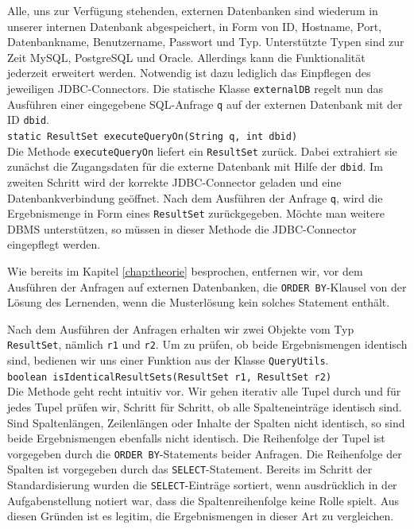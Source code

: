 Alle, uns zur Verfügung stehenden, externen Datenbanken sind wiederum in unserer internen Datenbank abgespeichert, in Form von ID, Hostname, Port, Datenbankname, Benutzername, Passwort und Typ. Unterstützte Typen sind zur Zeit MySQL, PostgreSQL und Oracle. Allerdings kann die Funktionalität jederzeit erweitert werden. Notwendig ist dazu lediglich das Einpflegen des jeweiligen JDBC-Connectors. Die statische Klasse \verb|externalDB| regelt nun das Ausführen einer eingegebene SQL-Anfrage \verb|q| auf der externen Datenbank mit der ID \verb|dbid|. \\
\verb|static ResultSet executeQueryOn(String q, int dbid)|\\
Die Methode \verb|executeQueryOn| liefert ein \verb|ResultSet| zurück. Dabei extrahiert sie zunächst die Zugangsdaten für die externe Datenbank mit Hilfe der \verb|dbid|. Im zweiten Schritt wird der korrekte JDBC-Connector geladen und eine Datenbankverbindung geöffnet. Nach dem Ausführen der Anfrage \verb|q|, wird die Ergebnismenge in Form eines \verb|ResultSet| zurückgegeben. Möchte man weitere DBMS unterstützen, so müssen in dieser Methode die JDBC-Connector eingepflegt werden.

Wie bereits im Kapitel \ref{chap:theorie} besprochen, entfernen wir, vor dem Ausführen der Anfragen auf externen Datenbanken, die \verb|ORDER BY|-Klausel von der Lösung des Lernenden, wenn die Musterlösung kein solches Statement enthält. 

Nach dem Ausführen der Anfragen erhalten wir zwei Objekte vom Typ \verb|ResultSet|, nämlich \verb|r1| und \verb|r2|. Um zu prüfen, ob beide Ergebnismengen identisch sind, bedienen wir uns einer Funktion aus der Klasse \verb|QueryUtils|.\\
\verb|boolean isIdenticalResultSets(ResultSet r1, ResultSet r2)|\\
Die Methode geht recht intuitiv vor. Wir gehen iterativ alle Tupel durch und für jedes Tupel prüfen wir, Schritt für Schritt, ob alle Spalteneinträge identisch sind. Sind Spaltenlängen, Zeilenlängen oder Inhalte der Spalten nicht identisch, so sind beide Ergebnismengen ebenfalls nicht identisch. Die Reihenfolge der Tupel ist vorgegeben durch die \verb|ORDER BY|-Statements beider Anfragen. Die Reihenfolge der Spalten ist vorgegeben durch das \verb|SELECT|-Statement. Bereits im Schritt der Standardisierung wurden die \verb|SELECT|-Einträge sortiert, wenn ausdrücklich in der Aufgabenstellung notiert war, dass die Spaltenreihenfolge keine Rolle spielt. Aus diesen Gründen ist es legitim, die Ergebnismengen in dieser Art zu vergleichen.

